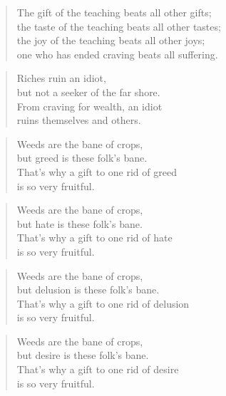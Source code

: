 \documentclass[12pt,openany]{book}%
\begin{document}
\begin{verse}%
The gift of the teaching beats all other gifts; \\
the taste of the teaching beats all other tastes; \\
the joy of the teaching beats all other joys; \\
one who has ended craving beats all suffering. 

%
\end{verse}

\begin{verse}%
Riches ruin an idiot, \\
but not a seeker of the far shore. \\
From craving for wealth, an idiot \\
ruins themselves and others. 

%
\end{verse}

\begin{verse}%
Weeds are the bane of crops, \\
but greed is these folk’s bane. \\
That’s why a gift to one rid of greed \\
is so very fruitful. 

%
\end{verse}

\begin{verse}%
Weeds are the bane of crops, \\
but hate is these folk’s bane. \\
That’s why a gift to one rid of hate \\
is so very fruitful. 

%
\end{verse}

\begin{verse}%
Weeds are the bane of crops, \\
but delusion is these folk’s bane. \\
That’s why a gift to one rid of delusion \\
is so very fruitful. 

%
\end{verse}

\begin{verse}%
Weeds are the bane of crops, \\
but desire is these folk’s bane. \\
That’s why a gift to one rid of desire \\
is so very fruitful. 

%
\end{verse}
\end{document}
